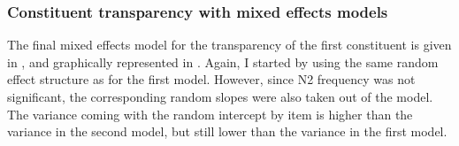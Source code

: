 \subsubsection{Constituent transparency with mixed effects models}
\label{sec:bs2013_mixed-effects-for-constituents}

The final mixed effects model for the transparency of the first constituent is given in
 , and graphically
represented in
. Again, I started by
using the same
random effect structure as for the first model. However, since N2
frequency was not significant, the corresponding random
slopes were also taken out of the model. The variance coming with
the random intercept by item is higher than the variance in the
second model, but still lower than the variance in the first model.

